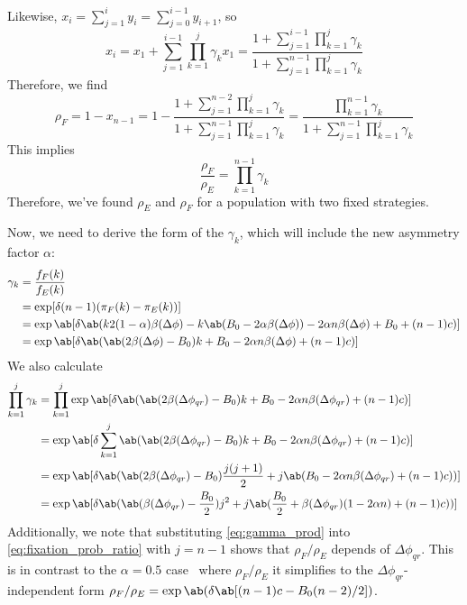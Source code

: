 Likewise, $x_i = \sum_{j=1}^i y_i = \sum_{j=0}^{i-1} y_{i+1}$, so
\begin{equation*}
  x_i
  = x_1 + \sum_{j=1}^{i-1} \prod_{k=1}^j \gamma_k x_1
  = \frac{1 + \sum_{j=1}^{i-1} \prod_{k=1}^j \gamma_k}
    {1 + \sum_{j=1}^{n-1} \prod_{k=1}^j \gamma_k}
\end{equation*}
Therefore, we find
\begin{equation*}
  \rho_F = 1 - x_{n-1}
  = 1 - \frac{1 + \sum_{j=1}^{n-2} \prod_{k=1}^j \gamma_k}
    {1 + \sum_{j=1}^{n-1} \prod_{k=1}^j \gamma_k}
  = \frac{\prod_{k=1}^{n-1} \gamma_k}{1 + \sum_{j=1}^{n-1} \prod_{k=1}^j \gamma_k}
\end{equation*}
This implies
\begin{equation}
  \frac{\rho_F}{\rho_E} = \prod_{k=1}^{n-1} \gamma_k
  \label{eq:fixation_prob_ratio}
\end{equation}
Therefore, we've found $\rho_E$ and $\rho_F$ for a population
with two fixed strategies.

Now, we need to derive the form of the $\gamma_k$,
which will include the new asymmetry factor $\alpha$:
\begin{align*}
  \gamma_k &= \frac{f_F(k)}{f_E(k)} \\
           &= \exp[\delta (n-1) (\pi_F(k) - \pi_E(k))]
           \\
           &= \exp\ab[\delta \ab(
    k 2 (1-\alpha) \beta(\Delta\phi)
    - k \ab(B_0 - 2 \alpha \beta(\Delta\phi))
                 - 2 \alpha n \beta(\Delta\phi) + B_0 + (n-1) c)] \\
      &= \exp\ab[\delta \ab(
    \ab(2 \beta(\Delta\phi) - B_0) k
                 + B_0 - 2 \alpha n \beta(\Delta\phi) + (n-1) c)]
\end{align*}
We also calculate
\begin{equation}
  \begin{aligned}
    \prod_{k=1}^j  \gamma_k
      &= \prod_{k=1}^j \exp\ab[\delta \ab(
      \ab(2 \beta(\Delta\phi_{qr}) - B_0) k
      + B_0 - 2 \alpha n \beta(\Delta\phi_{qr}) + (n-1) c)]
      \\
      &= \exp\ab[\delta \sum_{k=1}^j \ab(
      \ab(2 \beta(\Delta\phi_{qr}) - B_0) k
      + B_0 - 2 \alpha n \beta(\Delta\phi_{qr}) + (n-1) c)]
      \\
      &= \exp\ab[\delta \ab(
      \ab(2 \beta(\Delta\phi_{qr}) - B_0) \frac{j(j+1)}{2}
      + j \ab(B_0 - 2 \alpha n \beta(\Delta\phi_{qr}) + (n-1) c))]
      \\
      &= \exp\ab[\delta \ab(
      \ab(\beta(\Delta\phi_{qr}) - \frac{B_0}{2}) j^2
      + j \ab(\frac{B_0}{2} + \beta(\Delta\phi_{qr}) (1 - 2 \alpha n)  + (n-1) c))]
  \end{aligned}
  \label{eq:gamma_prod}
\end{equation}
Additionally, we note that substituting
\cref{eq:gamma_prod} into \cref{eq:fixation_prob_ratio}
with $j=n-1$ shows that $\rho_F/\rho_E$
depends of $\Delta \phi_{qr}$.
This is in contrast to the $\alpha=0.5$ case~\citep{tripp2022evolutionary}
where $\rho_F/\rho_E$ it simplifies to the $\Delta \phi_{qr}$-independent form
$\rho_F/\rho_E = \exp \ab(\delta \ab[(n-1)c - B_0 (n-2)/2])$.

